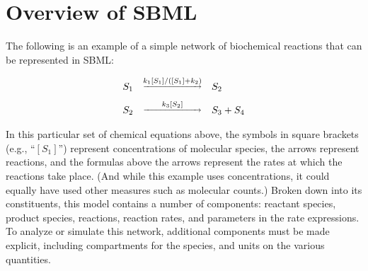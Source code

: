
\section{Overview of SBML}
\label{sec:overview}

The following is an example of a simple network of
biochemical reactions that can be represented in SBML:
\begin{linenomath}
  \begin{equation*}
    \begin{array}{@{}ccl@{}}
      S_1 & \overset{\underrightarrow{k_1 [S_1] / ([S_1] + k_2)}}{} & S_2 \\ \\[-5pt]
      S_2 & \overset{\underrightarrow{\rule{0.26in}{0pt}k_3 [S_2]\rule{0.26in}{0pt}}}{} & S_3 + S_4
    \end{array}
  \end{equation*}
\end{linenomath}
In this particular set of chemical equations above, the symbols in
square brackets (e.g., ``$[S_1]$'') represent concentrations of molecular
species, the arrows represent reactions, and the formulas above
the arrows represent the rates at which the reactions take place.
(And while this example uses concentrations, it could equally have used
other measures such as molecular counts.)
Broken down into its constituents, this model contains a number of
components: reactant species, product species, reactions,
reaction rates, and parameters in the rate expressions.  To analyze or
simulate this network, additional components must be made
explicit, including compartments for the species, and units on the
various quantities.

